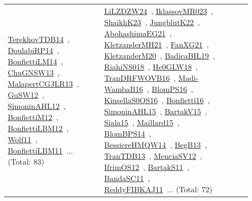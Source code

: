 {\begin{longtable}{lp{3cm}>{\raggedright\arraybackslash}p{6cm}>{\raggedright\arraybackslash}p{6cm}>{\raggedright\arraybackslash}p{8cm}}
\href{../works/TerekhovTDB14.pdf}{TerekhovTDB14}~\cite{TerekhovTDB14}, \href{../works/DoulabiRP14.pdf}{DoulabiRP14}~\cite{DoulabiRP14}, \href{../works/BonfiettiLM14.pdf}{BonfiettiLM14}~\cite{BonfiettiLM14}, \href{../works/ChuGNSW13.pdf}{ChuGNSW13}~\cite{ChuGNSW13}, \href{../works/MalapertCGJLR13.pdf}{MalapertCGJLR13}~\cite{MalapertCGJLR13}, \href{../works/GuSW12.pdf}{GuSW12}~\cite{GuSW12}, \href{../works/SimoninAHL12.pdf}{SimoninAHL12}~\cite{SimoninAHL12}, \href{../works/BonfiettiM12.pdf}{BonfiettiM12}~\cite{BonfiettiM12}, \href{../works/BonfiettiLBM12.pdf}{BonfiettiLBM12}~\cite{BonfiettiLBM12}, \href{../works/Wolf11.pdf}{Wolf11}~\cite{Wolf11}, \href{../works/BonfiettiLBM11.pdf}{BonfiettiLBM11}~\cite{BonfiettiLBM11}... (Total: 83) & \href{../works/LiLZDZW24.pdf}{LiLZDZW24}~\cite{LiLZDZW24}, \href{../works/IklassovMR023.pdf}{IklassovMR023}~\cite{IklassovMR023}, \href{../works/ShaikhK23.pdf}{ShaikhK23}~\cite{ShaikhK23}, \href{../works/JungblutK22.pdf}{JungblutK22}~\cite{JungblutK22}, \href{../works/AbohashimaEG21.pdf}{AbohashimaEG21}~\cite{AbohashimaEG21}, \href{../works/KletzanderMH21.pdf}{KletzanderMH21}~\cite{KletzanderMH21}, \href{../works/FanXG21.pdf}{FanXG21}~\cite{FanXG21}, \href{../works/KletzanderM20.pdf}{KletzanderM20}~\cite{KletzanderM20}, \href{../works/BadicaBIL19.pdf}{BadicaBIL19}~\cite{BadicaBIL19}, \href{../works/RiahiNS018.pdf}{RiahiNS018}~\cite{RiahiNS018}, \href{../works/He0GLW18.pdf}{He0GLW18}~\cite{He0GLW18}, \href{../works/TranDRFWOVB16.pdf}{TranDRFWOVB16}~\cite{TranDRFWOVB16}, \href{../works/Madi-WambaB16.pdf}{Madi-WambaB16}~\cite{Madi-WambaB16}, \href{../works/BlomPS16.pdf}{BlomPS16}~\cite{BlomPS16}, \href{../works/KinsellaS0OS16.pdf}{KinsellaS0OS16}~\cite{KinsellaS0OS16}, \href{../works/Bonfietti16.pdf}{Bonfietti16}~\cite{Bonfietti16}, \href{../works/SimoninAHL15.pdf}{SimoninAHL15}~\cite{SimoninAHL15}, \href{../works/BartakV15.pdf}{BartakV15}~\cite{BartakV15}, \href{../works/Siala15.pdf}{Siala15}~\cite{Siala15}, \href{../works/Maillard15.pdf}{Maillard15}~\cite{Maillard15}, \href{../works/BlomBPS14.pdf}{BlomBPS14}~\cite{BlomBPS14}, \href{../works/BessiereHMQW14.pdf}{BessiereHMQW14}~\cite{BessiereHMQW14}, \href{../works/BegB13.pdf}{BegB13}~\cite{BegB13}, \href{../works/TranTDB13.pdf}{TranTDB13}~\cite{TranTDB13}, \href{../works/MenciaSV12.pdf}{MenciaSV12}~\cite{MenciaSV12}, \href{../works/IfrimOS12.pdf}{IfrimOS12}~\cite{IfrimOS12}, \href{../works/BartakS11.pdf}{BartakS11}~\cite{BartakS11}, \href{../works/BandaSC11.pdf}{BandaSC11}~\cite{BandaSC11}, \href{../works/ReddyFIBKAJ11.pdf}{ReddyFIBKAJ11}~\cite{ReddyFIBKAJ11}... (Total: 72)\\

\end{longtable}}
